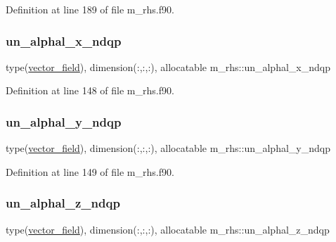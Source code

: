 Definition at line 189 of file m\+\_\+rhs.\+f90.

\mbox{\label{namespacem__rhs_ab49ec164612765d8947ccf4250dd0fb0}} 
\subsubsection{\texorpdfstring{un\+\_\+alphal\+\_\+x\+\_\+ndqp}{un\_alphal\_x\_ndqp}}
{\footnotesize\ttfamily type(\hyperlink{structm__derived__types_1_1vector__field}{vector\+\_\+field}), dimension(\+:,\+:,\+:), allocatable m\+\_\+rhs\+::un\+\_\+alphal\+\_\+x\+\_\+ndqp}



Definition at line 148 of file m\+\_\+rhs.\+f90.

\mbox{\label{namespacem__rhs_ab99096402fadc8b539f8a031dfdb3ffe}} 
\subsubsection{\texorpdfstring{un\+\_\+alphal\+\_\+y\+\_\+ndqp}{un\_alphal\_y\_ndqp}}
{\footnotesize\ttfamily type(\hyperlink{structm__derived__types_1_1vector__field}{vector\+\_\+field}), dimension(\+:,\+:,\+:), allocatable m\+\_\+rhs\+::un\+\_\+alphal\+\_\+y\+\_\+ndqp}



Definition at line 149 of file m\+\_\+rhs.\+f90.

\mbox{\label{namespacem__rhs_a3a70e0b6fb4faaa4800bf2a7aa2519af}} 
\subsubsection{\texorpdfstring{un\+\_\+alphal\+\_\+z\+\_\+ndqp}{un\_alphal\_z\_ndqp}}
{\footnotesize\ttfamily type(\hyperlink{structm__derived__types_1_1vector__field}{vector\+\_\+field}), dimension(\+:,\+:,\+:), allocatable m\+\_\+rhs\+::un\+\_\+alphal\+\_\+z\+\_\+ndqp}



